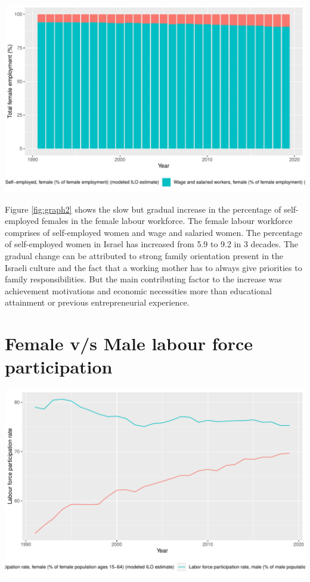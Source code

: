\documentclass[11pt,a4paper,]{article}
\let\origfigure\figure
\let\endorigfigure\endfigure
\renewenvironment{figure}[1][2] {
    \expandafter\origfigure\expandafter[H]
} {
    \endorigfigure
}%
\begin{document}
\begin{figure}
\centering
\includegraphics{report_files/figure-latex/graph2-1.pdf}
\caption{\label{fig:graph2}Self-employed v/s Wage \& salaried female
workers}
\end{figure}

Figure \ref{fig:graph2} shows the slow but gradual increase in the
percentage of self-employed females in the female labour workforce. The
female labour workforce comprises of self-employed women and wage and
salaried women. The percentage of self-employed women in Israel has
increased from 5.9 to 9.2 in 3 decades. The gradual change can be
attributed to strong family orientation present in the Israeli culture
and the fact that a working mother has to always give priorities to
family responsibilities. But the main contributing factor to the
increase was achievement motivations and economic necessities more than
educational attainment or previous entrepreneurial experience.
\textcite{lerner1997israeli}

\section{Female v/s Male labour force
participation}\label{female-vs-male-labour-force-participation}

\begin{figure}
\centering
\includegraphics{report_files/figure-latex/graph3-1.pdf}
\caption{\label{fig:graph3}Female v/s Male labour force participation}
\end{figure}
\end{document}
